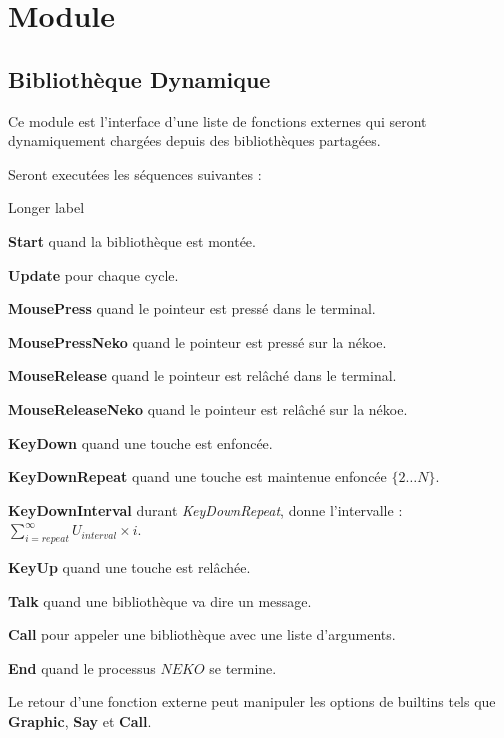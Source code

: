 \documentclass{report}
\newcommand{\program}{\textit{NEKO}}
\begin{document}
\newpage

\section{Module}

\subsection{Bibliothèque Dynamique}

Ce module est l'interface d'une liste de fonctions externes qui seront dynamiquement chargées depuis des bibliothèques partagées.

Seront executées les séquences suivantes :

\begin{labeling}{Longer label\quad}
	\item[\textbf{Start} quand la bibliothèque est montée.]
	\item[\textbf{Update} pour chaque cycle.]
	\item[\textbf{MousePress} quand le pointeur est pressé dans le terminal.]
	\item[\textbf{MousePressNeko} quand le pointeur est pressé sur la nékoe.]
	\item[\textbf{MouseRelease} quand le pointeur est relâché dans le terminal.]
	\item[\textbf{MouseReleaseNeko} quand le pointeur est relâché sur la nékoe.]
	\item[\textbf{KeyDown} quand une touche est enfoncée.]
	\item[\textbf{KeyDownRepeat} quand une touche est maintenue enfoncée $\{2\dots{}N\}$.]
	\item[\textbf{KeyDownInterval} durant \textit{KeyDownRepeat}, donne l'intervalle : $\sum_{i=repeat}^{\infty} U_{interval}\times{}i$.]
	\item[\textbf{KeyUp} quand une touche est relâchée.]
	\item[\textbf{Talk} quand une bibliothèque va dire un message.]
	\item[\textbf{Call} pour appeler une bibliothèque avec une liste d'arguments.]
	\item[\textbf{End} quand le processus $\program$ se termine.]
\end{labeling}

Le retour d'une fonction externe peut manipuler les options de builtins tels que \textbf{Graphic}, \textbf{Say} et \textbf{Call}.
\end{document}
